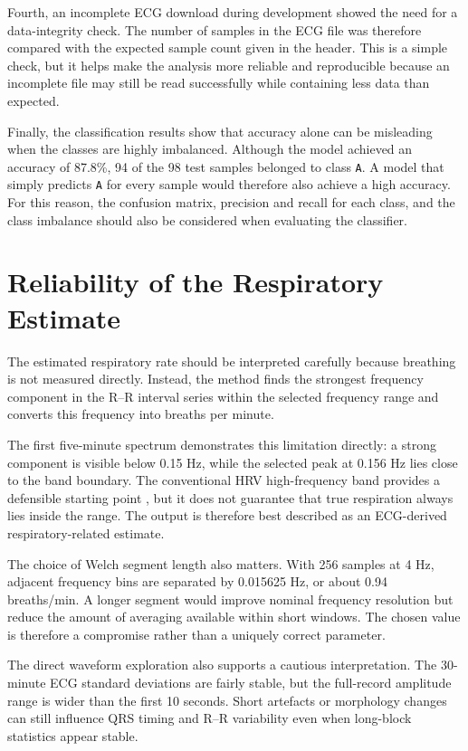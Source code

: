 \documentclass[a4paper,10.5pt,oneside]{report}
\begin{document}
Fourth, an incomplete ECG download during development showed the need for a data-integrity check. The number of samples in the ECG file was therefore compared with the expected sample count given in the header. This is a simple check, but it helps make the analysis more reliable and reproducible because an incomplete file may still be read successfully while containing less data than expected.

Finally, the classification results show that accuracy alone can be misleading when the classes are highly imbalanced. Although the model achieved an accuracy of 87.8\%, 94 of the 98 test samples belonged to class \texttt{A}. A model that simply predicts \texttt{A} for every sample would therefore also achieve a high accuracy. For this reason, the confusion matrix, precision and recall for each class, and the class imbalance should also be considered when evaluating the classifier.

\section{Reliability of the Respiratory Estimate}

The estimated respiratory rate should be interpreted carefully because breathing is not measured directly. Instead, the method finds the strongest frequency component in the R--R interval series within the selected frequency range and converts this frequency into breaths per minute.

The first five-minute spectrum demonstrates this limitation directly: a strong
component is visible below 0.15 Hz, while the selected peak at 0.156 Hz lies
close to the band boundary. The conventional HRV high-frequency band provides
a defensible starting point \citep{taskforce1996}, but it does not guarantee
that true respiration always lies inside the range. The output is therefore
best described as an ECG-derived respiratory-related estimate.

The choice of Welch segment length also matters. With 256 samples at 4 Hz,
adjacent frequency bins are separated by 0.015625 Hz, or about
0.94 breaths/min. A longer segment would improve nominal frequency resolution
but reduce the amount of averaging available within short windows. The chosen
value is therefore a compromise rather than a uniquely correct parameter.

The direct waveform exploration also supports a cautious interpretation. The
30-minute ECG standard deviations are fairly stable, but the full-record
amplitude range is wider than the first 10 seconds. Short artefacts or
morphology changes can still influence QRS timing and R--R variability even
when long-block statistics appear stable.
\end{document}
